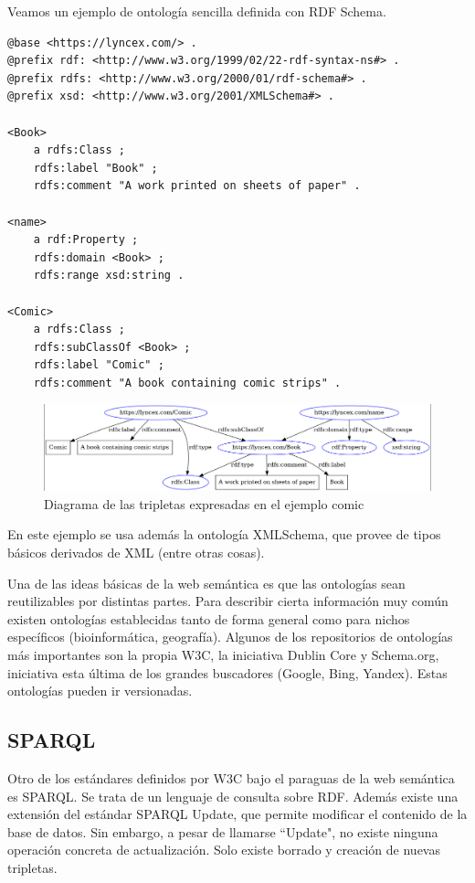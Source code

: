 \documentclass[openright,twoside,12pt]{book}
\begin{document}
Veamos un ejemplo de ontología sencilla definida con RDF Schema.

\begin{lstlisting}
@base <https://lyncex.com/> .
@prefix rdf: <http://www.w3.org/1999/02/22-rdf-syntax-ns#> .
@prefix rdfs: <http://www.w3.org/2000/01/rdf-schema#> .
@prefix xsd: <http://www.w3.org/2001/XMLSchema#> .

<Book>
    a rdfs:Class ;
    rdfs:label "Book" ;
    rdfs:comment "A work printed on sheets of paper" .

<name>
    a rdf:Property ;
    rdfs:domain <Book> ;
    rdfs:range xsd:string .

<Comic>
    a rdfs:Class ;
    rdfs:subClassOf <Book> ;
    rdfs:label "Comic" ;
    rdfs:comment "A book containing comic strips" .

\end{lstlisting}

\begin{figure}
    \centering
    \includegraphics[width=\textwidth]{comic.png}
    \caption{Diagrama de las tripletas expresadas en el ejemplo comic}
    \label{fig:comic}
\end{figure}

En este ejemplo se usa además la ontología XMLSchema\cite{xmlschema}, que provee de tipos básicos derivados de XML (entre otras cosas).

Una de las ideas básicas de la web semántica es que las ontologías sean reutilizables por distintas partes. Para describir cierta información muy común existen ontologías establecidas tanto de forma general como para nichos específicos (bioinformática, geografía). Algunos de los repositorios de ontologías más importantes son la propia W3C, la iniciativa Dublin Core\cite{dublincore} y Schema.org\cite{schema}, iniciativa esta última de los grandes buscadores (Google, Bing, Yandex). Estas ontologías pueden ir versionadas.


\subsection{SPARQL}

Otro de los estándares definidos por W3C bajo el paraguas de la web semántica es SPARQL\cite{sparql}. Se trata de un lenguaje de consulta sobre RDF. Además existe una extensión del estándar SPARQL Update, que permite modificar el contenido de la base de datos. Sin embargo, a pesar de llamarse ``Update", no existe ninguna operación concreta de actualización. Solo existe borrado y creación de nuevas tripletas.
\end{document}
